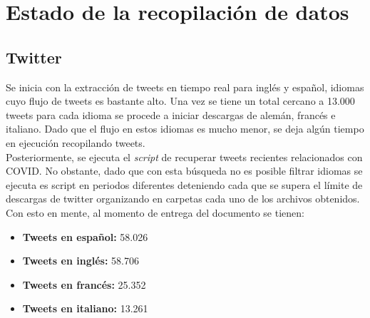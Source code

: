 \section{Estado de la recopilación de datos}
\subsection{Twitter}
Se inicia con la extracción de tweets en tiempo real para inglés y español, idiomas cuyo flujo de tweets es bastante alto. Una vez se tiene un total cercano a 13.000 tweets para cada idioma se procede a iniciar descargas de alemán, francés e italiano. Dado que el flujo en estos idiomas es mucho menor, se deja algún tiempo en ejecución recopilando tweets.\\

Posteriormente, se ejecuta el \textit{script} de recuperar tweets recientes relacionados con COVID. No obstante, dado que con esta búsqueda no es posible filtrar idiomas se ejecuta es script en periodos diferentes deteniendo cada que se supera el límite de descargas de twitter organizando en carpetas cada uno de los archivos obtenidos. Con esto en mente, al momento de entrega del documento se tienen:
\begin{itemize}
    \item \textbf{Tweets en español:} 58.026
    \item \textbf{Tweets en inglés:} 58.706
    \item \textbf{Tweets en francés:} 25.352
    \item \textbf{Tweets en italiano:} 13.261
\end{itemize}